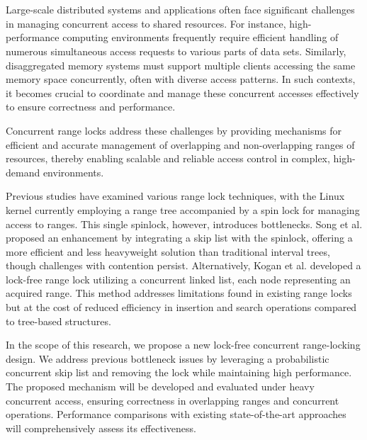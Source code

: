 \chapter{\abstractname}

Large-scale distributed systems and applications often face significant challenges in managing concurrent access to shared resources.
For instance, high-performance computing environments frequently require efficient handling of numerous simultaneous access requests to various parts of data sets.
Similarly, disaggregated memory systems must support multiple clients accessing the same memory space concurrently, often with diverse access patterns. In such contexts, it becomes crucial to coordinate and manage these concurrent accesses effectively to ensure correctness and performance.

Concurrent range locks address these challenges by providing mechanisms for efficient and accurate management of overlapping and non-overlapping ranges of resources, thereby enabling scalable and reliable access control in complex, high-demand environments.

Previous studies have examined various range lock techniques, with the Linux kernel currently employing a range tree accompanied by a spin lock for managing access to ranges. 
This single spinlock, however, introduces bottlenecks. 
Song et al. proposed an enhancement by integrating a skip list with the spinlock, offering a more efficient and less heavyweight solution than traditional interval trees, though challenges with contention persist. 
Alternatively, Kogan et al. developed a lock-free range lock utilizing a concurrent linked list, each node representing an acquired range. This method addresses limitations found in existing range locks but at the cost of reduced efficiency in insertion and search operations compared to tree-based structures.

In the scope of this research, we propose a new lock-free concurrent range-locking design. We address previous bottleneck issues by leveraging a probabilistic concurrent skip list and removing the lock while maintaining high performance. The proposed mechanism will be developed and evaluated under heavy concurrent access, ensuring correctness in overlapping ranges and concurrent operations. Performance comparisons with existing state-of-the-art approaches will comprehensively assess its effectiveness.

